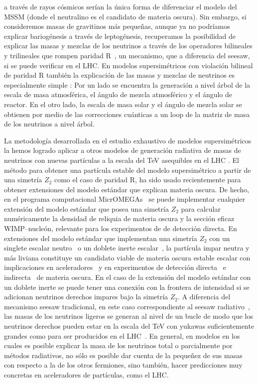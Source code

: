 a través de rayos cósmicos serían la única forma de diferenciar el
modelo del MSSM (donde el neutralino es el candidato de materia
oscura). Sin embargo, si consideremos masas de gravitinos más
pequeñas, aunque ya no podríamos explicar bariogénesis a través de
leptogénesis, recuperamos la posibilidad de explicar las masas y
mezclas de los neutrinos a través de los operadores bilineales y
trilineales que rompen paridad R~\cite{Hirsch:2005ag}, un mecanismo,
que a diferencia del seesaw, si se puede verificar en el LHC.
En modelos supersimétricos con violación bilineal de paridad R también
la explicación de las masas y mezclas de neutrinos es especialmente
simple \cite{Hirsch:2004he,Hirsch:2008ur}: Por un lado se encuentra la
generación a nivel árbol de la escala de masa atmosférica, el ángulo
de mezcla atmosférico y el ángulo de reactor. En el otro lado, la
escala de masa solar y el ángulo de mezcla solar se obtienen por medio
de las correcciones cuánticas a un loop de la matriz de masa de los
neutrinos a nivel árbol.

La metodología desarrollada en el estudio exhaustivo de modelos
supersimétricos la hemos logrado aplicar a otros modelos de generación
radiativa de masas de neutrinos con nuevas partículas a la escala del
TeV asequibles en el LHC
\cite{Sierra:2008wj,AristizabalSierra:2006ri}.
El método para obtener una partícula estable del modelo supersimétrico
a partir de una simetría $Z_2$ como el caso de paridad R, ha sido
usado recientemente para obtener extensiones del modelo estándar que
explican materia oscura. De hecho, en el programa computacional
MicrOMEGAs~\cite{Belanger:2006is} se puede implementar cualquier
extensión del modelo estándar que posea una simetría $Z_2$ para
calcular numéricamente la densidad de reliquia de materia oscura y la
sección eficaz WIMP--nucleón, relevante para los experimentos de de
detección directa. En extensiones del modelo estándar que implementan
una simetría $Z_2$ con un singlete escalar
neutro~\cite{Yaguna:2008hd,Goudelis:2009zz,Yaguna:2011qn} o un doblete
inerte escalar~\cite{}, la partícula impar neutra y más liviana
constituye un candidato viable de materia oscura estable escalar con
implicaciones en aceleradores~\cite{} y en experimentos de detección
directa~\cite{} e indirecta~\cite{Goudelis:2009zz} de materia
oscura. En el caso de la extensión del modelo estándar con un doblete
inerte se puede tener una conexión con la frontera de intensidad si se
adicionan neutrinos derechos impares bajo la simetría $Z_2$. A
diferencia del mecanismo seesaw tradicional, en este caso
correspondiente al seesaw radiativo~\cite{}, las masas de los
neutrinos ligeros se generan al nivel de un bucle de modo que los
neutrinos derechos pueden estar en la escala del TeV con yukawas
suficientemente grandes como para ser producidos en el
LHC~\cite{Sierra:2008wj}. En general, en modelos en los cuales es
posible explicar la masa de los neutrinos total o parcialmente por
métodos radiativos, no sólo es posible dar cuenta de la pequeñez de
sus masas con respecto a la de los otros fermiones, sino también,
hacer predicciones muy concretas en aceleradores de partículas, como
el LHC.


